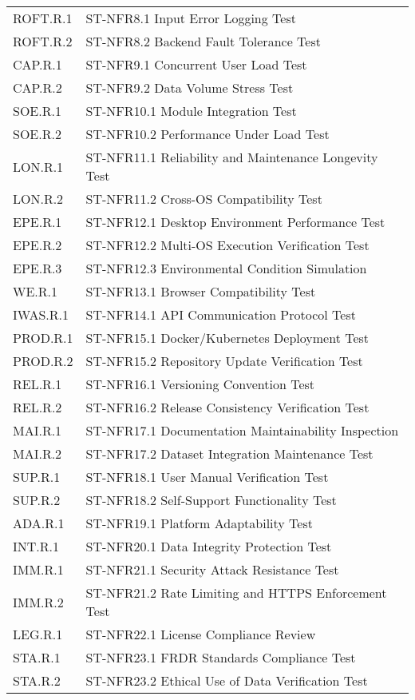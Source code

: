 \documentclass[12pt, titlepage]{article}
\begin{document}
\begin{longtable}{|l|p{10cm}|}
ROFT.R.1 & ST-NFR8.1 Input Error Logging Test \\
ROFT.R.2 & ST-NFR8.2 Backend Fault Tolerance Test \\
CAP.R.1 & ST-NFR9.1 Concurrent User Load Test \\
CAP.R.2 & ST-NFR9.2 Data Volume Stress Test \\
SOE.R.1 & ST-NFR10.1 Module Integration Test \\
SOE.R.2 & ST-NFR10.2 Performance Under Load Test \\
LON.R.1 & ST-NFR11.1 Reliability and Maintenance Longevity Test \\
LON.R.2 & ST-NFR11.2 Cross-OS Compatibility Test \\
EPE.R.1 & ST-NFR12.1 Desktop Environment Performance Test \\
EPE.R.2 & ST-NFR12.2 Multi-OS Execution Verification Test \\
EPE.R.3 & ST-NFR12.3 Environmental Condition Simulation \\
WE.R.1 & ST-NFR13.1 Browser Compatibility Test \\
IWAS.R.1 & ST-NFR14.1 API Communication Protocol Test \\
PROD.R.1 & ST-NFR15.1 Docker/Kubernetes Deployment Test \\
PROD.R.2 & ST-NFR15.2 Repository Update Verification Test \\
REL.R.1 & ST-NFR16.1 Versioning Convention Test \\
REL.R.2 & ST-NFR16.2 Release Consistency Verification Test \\
MAI.R.1 & ST-NFR17.1 Documentation Maintainability Inspection \\
MAI.R.2 & ST-NFR17.2 Dataset Integration Maintenance Test \\
SUP.R.1 & ST-NFR18.1 User Manual Verification Test \\
SUP.R.2 & ST-NFR18.2 Self-Support Functionality Test \\
ADA.R.1 & ST-NFR19.1 Platform Adaptability Test \\
INT.R.1 & ST-NFR20.1 Data Integrity Protection Test \\
IMM.R.1 & ST-NFR21.1 Security Attack Resistance Test \\
IMM.R.2 & ST-NFR21.2 Rate Limiting and HTTPS Enforcement Test \\
LEG.R.1 & ST-NFR22.1 License Compliance Review \\
STA.R.1 & ST-NFR23.1 FRDR Standards Compliance Test \\
STA.R.2 & ST-NFR23.2 Ethical Use of Data Verification Test \\

\end{longtable}
\end{document}
